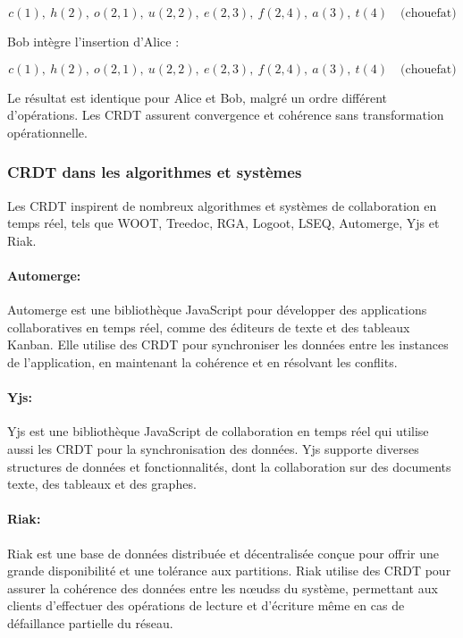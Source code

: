 \begin{equation}
    c(1), \ h(2), \ o(2, 1), \ u(2, 2), \ e(2, 3), \ f(2, 4), \ a(3), \ t(4) \quad \text{(chouefat)}
\end{equation}

Bob intègre l'insertion d'Alice :

\begin{equation}
    c(1), \ h(2), \ o(2, 1), \ u(2, 2), \ e(2, 3), \ f(2, 4), \ a(3), \ t(4) \quad \text{(chouefat)}
\end{equation}

Le résultat est identique pour Alice et Bob, malgré un ordre différent d'opérations. Les CRDT assurent convergence et cohérence sans transformation opérationnelle.
\subsubsection{CRDT dans les algorithmes et systèmes}
Les CRDT inspirent de nombreux algorithmes et systèmes de collaboration en temps réel, tels que WOOT, Treedoc, RGA, Logoot, LSEQ, Automerge, Yjs et Riak.

\paragraph{Automerge\cite{hardenbergAutomerge2023}: } Automerge est une bibliothèque JavaScript pour développer des applications collaboratives en temps réel, comme des éditeurs de texte et des tableaux Kanban. Elle utilise des CRDT pour synchroniser les données entre les instances de l'application, en maintenant la cohérence et en résolvant les conflits.

\paragraph{Yjs\cite{nicolaescuYjsFrameworkRealTime2015}: } Yjs est une bibliothèque JavaScript de collaboration en temps réel qui utilise aussi les CRDT pour la synchronisation des données. Yjs supporte diverses structures de données et fonctionnalités, dont la collaboration sur des documents texte, des tableaux et des graphes.

\paragraph{Riak\cite{amazon.comRiakDynamoAmazon2007}: } Riak est une base de données distribuée et décentralisée conçue pour offrir une grande disponibilité et une tolérance aux partitions. Riak utilise des CRDT pour assurer la cohérence des données entre les n\oe udss du système, permettant aux clients d'effectuer des opérations de lecture et d'écriture même en cas de défaillance partielle du réseau.

